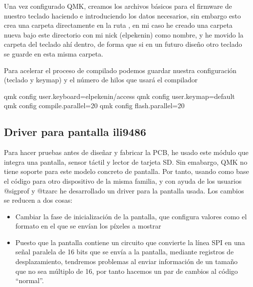 Una vez configurado QMK, creamos los archivos básicos para el firmware de nuestro teclado haciendo  e introduciendo los datos necesarios, sin embargo esto crea una carpeta directamente en la ruta , en mi caso he creado una carpeta nueva bajo este directorio con mi nick (elpekenin) como nombre, y he movido la carpeta del teclado ahí dentro, de forma que si en un futuro diseño otro teclado se guarde en esta misma carpeta.

Para acelerar el proceso de compilado podemos guardar nuestra configuración (teclado y keymap) y el número de hilos que usará el compilador
\begin{multicli}
    \cliarrow qmk config user.keyboard=elpekenin/access \newline
    \cliarrow qmk config user.keymap=default \newline
    \cliarrow qmk config compile.parallel=20 \newline
    \cliarrow qmk config flash.parallel=20
\end{multicli}

\subsection{Driver para pantalla ili9486}
Para hacer pruebas antes de diseñar y fabricar la PCB, he usado este módulo\cite{waveshare} que integra una pantalla, sensor táctil y lector de tarjeta SD. \newline
Sin emabargo, QMK no tiene soporte para este modelo concreto de pantalla. Por tanto, usando como base el código\cite{ili9488} para otro dispositivo de la misma familia, y con ayuda de los usuarios @sigprof y @tzarc he desarrollado un driver\cite{ili9486-pr} para la pantalla usada. \newline
Los cambios se reducen a dos cosas:
\begin{itemize}
    \item Cambiar la fase de inicialización de la pantalla, que configura valores como el formato en el que se envían los píxeles a mostrar
    \item Puesto que la pantalla contiene un circuito que convierte la línea SPI en una señal paralela de 16 bits que se envía a la pantalla, mediante registros de desplazamiento, tendremos problemas al enviar información de un tamaño que no sea múltiplo de 16, por tanto hacemos un par de cambios al código ``normal''.
\end{itemize}

